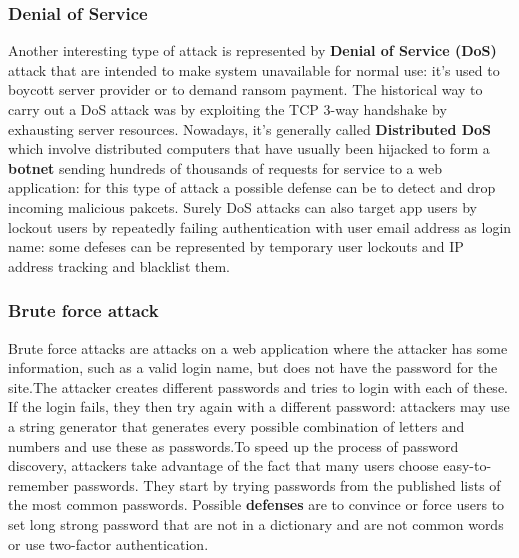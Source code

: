 \documentclass[10pt,a4paper]{report}
\begin{document}
\subsubsection{Denial of Service}
Another interesting type of attack is represented by \textbf{Denial of Service (DoS)} attack that are intended to make system unavailable for normal use: it's used to boycott server provider or to demand ransom payment. The historical way to carry out a DoS attack was by exploiting the TCP 3-way handshake by exhausting server resources. Nowadays, it's generally called \textbf{Distributed DoS} which involve distributed computers that have usually been hijacked to form a \textbf{botnet} sending hundreds of thousands of requests for service to a web application: for this type of attack a possible defense can be to detect and drop incoming malicious pakcets. Surely DoS attacks can also target app users  by lockout users by repeatedly failing authentication with user email address as login name: some defeses can be represented by temporary user lockouts and IP address tracking and blacklist them. 

\subsubsection{Brute force attack}
Brute force attacks are attacks on a web application where the attacker has some information, such as a valid login name, but does not have the
password for the site.The attacker creates different passwords and tries to login with each of these. If the login fails, they then try again with a different password: attackers may use a string generator that generates every possible combination of letters and numbers and use these as passwords.To speed up the process of password discovery, attackers take advantage of the fact that many users choose easy-to-remember passwords. They start by trying passwords from the published lists of the most common passwords.
Possible \textbf{defenses} are to convince or force users to set long strong password that are not in a dictionary and are not common words or use two-factor authentication. 
\end{document}
